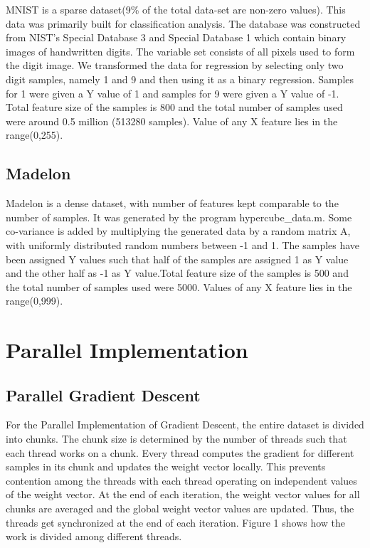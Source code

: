 \documentclass{sigplanconf}
\begin{document}
MNIST is a sparse dataset(9\% of the total data-set are non-zero values). This data was primarily built for classification analysis. The database was constructed from NIST's Special Database 3 and Special Database 1 which contain binary images of handwritten digits. The variable set consists of all pixels used to form the digit image. We transformed the data for regression by selecting only two digit samples, namely 1 and 9 and then using it as a binary regression. Samples for 1 were given a Y value of 1 and samples for 9 were given a Y value of -1. Total feature size of the samples is 800 and the total number of samples used were around 0.5 million (513280 samples). Value of any X feature lies in the range(0,255).

\subsection{Madelon}
Madelon is a dense dataset, with number of features kept comparable to the number of samples. It was generated by the program hypercube\_data.m. Some co-variance is added by multiplying the generated data by a random matrix A, with uniformly distributed random numbers between -1 and 1. The samples have been assigned Y values such that half of the samples are assigned 1 as Y value and the other half as -1 as Y value.Total feature size of the samples is 500 and the total number of samples used were 5000. Values of any X feature lies in the range(0,999).

\section{Parallel Implementation}
\subsection{Parallel Gradient Descent}
For the Parallel Implementation of Gradient Descent, the entire dataset is divided into chunks. The chunk size is determined by the number
of threads such that each thread works on a chunk. Every thread computes the gradient for different samples in its chunk and updates
the weight vector locally. This prevents contention among the threads with each thread operating on independent values of the weight
vector. At the end of each iteration, the weight vector values for all chunks are averaged and the global weight vector
values are updated. Thus, the threads get synchronized at the end of each iteration. Figure 1 shows how the work is divided among different
threads.
\end{document}
